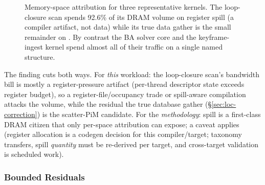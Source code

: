 \begin{figure}[t]
\centering
{}
\caption[Per-kernel memory-space attribution.]{Memory-space attribution for three
representative kernels. The loop-closure scan \stTrack{} spends 92.6\% of its DRAM
volume on register spill (a compiler artifact, not data) while its true data
gather is the small remainder on . By contrast the BA
solver core and the keyframe-ingest kernel spend almost all of their traffic on a
single named structure.}
\label{fig:attrib}
\end{figure} The finding cuts both ways. For \emph{this} workload: the loop-closure scan’s bandwidth bill is mostly a register-pressure artifact (per-thread descriptor state exceeds register budget), so a register-file/occupancy trade or spill-aware compilation attacks the volume, while the residual the true database gather (\S\ref{sec:loc-correction}) is the scatter-PiM candidate. For the \emph{methodology}: spill is a first-class DRAM citizen that only per-space attribution can expose; a caveat applies (register allocation is a codegen decision for this compiler/target; taxonomy transfers, spill \emph{quantity} must be re-derived per target, and cross-target validation is scheduled work).

\subsubsection{Bounded Residuals}
\label{sec:attr-residuals}

